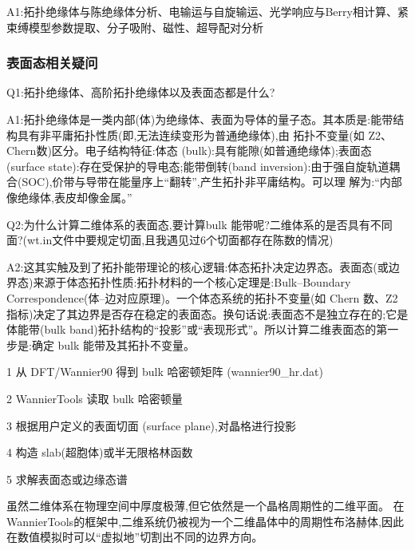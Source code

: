 \documentclass[lang=cn,scheme=chinese,color=blue,device=normal,toc=onecol,math=cm]{elegantbook}
\begin{document}
A1:拓扑绝缘体与陈绝缘体分析、电输运与自旋输运、光学响应与Berry相计算、紧束缚模型参数提取、分子吸附、磁性、超导配对分析\par


\subsubsection{表面态相关疑问}


Q1:拓扑绝缘体、高阶拓扑绝缘体以及表面态都是什么?\par


A1:拓扑绝缘体是一类内部(体)为绝缘体、表面为导体的量子态。其本质是:能带结构具有非平庸拓扑性质(即,无法连续变形为普通绝缘体),由 拓扑不变量(如 Z2、Chern数)区分。电子结构特征:体态 (bulk):具有能隙(如普通绝缘体);表面态(surface state):存在受保护的导电态;能带倒转(band inversion):由于强自旋轨道耦合(SOC),价带与导带在能量序上“翻转”,产生拓扑非平庸结构。可以理 解为:“内部像绝缘体,表皮却像金属。”\par


Q2:为什么计算二维体系的表面态,要计算bulk 能带呢?二维体系的是否具有不同面?(wt.in文件中要规定切面,且我遇见过6个切面都存在陈数的情况)\par


A2:这其实触及到了拓扑能带理论的核心逻辑:体态拓扑决定边界态。表面态(或边界态)来源于体态拓扑性质:拓扑材料的一个核心定理是:Bulk–Boundary Correspondence(体–边对应原理)。一个体态系统的拓扑不变量(如 Chern 数、Z2 指标)决定了其边界是否存在稳定的表面态。换句话说:表面态不是独立存在的;它是体能带(bulk band)拓扑结构的“投影”或“表现形式”。所以计算二维表面态的第一步是:确定 bulk 能带及其拓扑不变量。\par


1 从 DFT/\allowbreak{}Wannier90 得到 bulk 哈密顿矩阵 (wannier90\_\allowbreak{}hr.dat)\par


2 WannierTools 读取 bulk 哈密顿量\par


3 根据用户定义的表面切面 (surface plane),对晶格进行投影\par


4 构造 slab(超胞体)或半无限格林函数\par


5 求解表面态或边缘态谱\par


虽然二维体系在物理空间中厚度极薄,但它依然是一个晶格周期性的二维平面。 在WannierTools的框架中,二维系统仍被视为一个二维晶体中的周期性布洛赫体,因此在数值模拟时可以“虚拟地”切割出不同的边界方向。\par
\end{document}
